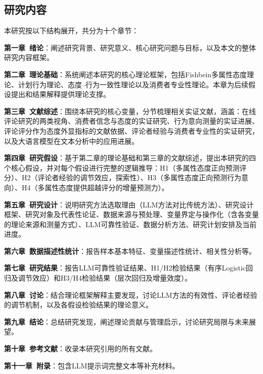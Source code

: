 \subsection{研究内容}

本研究按以下结构展开，共分为十个章节：

\textbf{第一章\ 绪论}：阐述研究背景、研究意义、核心研究问题与目标，以及本文的整体研究内容框架。

\textbf{第二章\ 理论基础}：系统阐述本研究的核心理论框架，包括Fishbein多属性态度理论、计划行为理论、态度--行为一致性理论以及消费者专业性理论。本章为后续假设提出和结果解释提供理论支撑。

\textbf{第三章\ 文献综述}：围绕本研究的核心变量，分节梳理相关实证文献，涵盖：在线评论研究的两类视角、消费者信念与态度的实证研究、行为意向测量的实证进展、评论评分作为态度外显指标的文献依据、评论者经验与消费者专业性的实证研究，以及大语言模型在文本分析中的应用进展。

\textbf{第四章\ 研究假设}：基于第二章的理论基础和第三章的文献综述，提出本研究的四个核心假设，并对每个假设进行完整的逻辑推导：H1（多属性态度正向预测评分）、H2（评论者经验的调节效应，探索性）、H3（多属性态度正向预测行为意向）、H4（多属性态度提供超越评分的增量预测力）。

\textbf{第五章\ 研究设计}：说明研究方法选取理由（LLM方法对比传统方法）、研究设计框架、研究对象及代表性论证、数据来源与预处理、变量界定与操作化（含各变量的理论来源和测量方式）、LLM可靠性验证、数据分析方法、研究计划安排及当前进度。

\textbf{第六章\ 数据描述性统计}：报告样本基本特征、变量描述性统计、相关性分析等。

\textbf{第七章\ 研究结果}：报告LLM可靠性验证结果、H1/H2检验结果（有序Logistic回归及调节效应）和H3/H4检验结果（层次回归及增量效度）。

\textbf{第八章\ 讨论}：结合理论框架解释主要发现，讨论LLM方法的有效性、评论者经验的调节机制，以及各假设检验结果的理论意义。

\textbf{第九章\ 结论}：总结研究发现，阐述理论贡献与管理启示，讨论研究局限与未来展望。

\textbf{第十章\ 参考文献}：收录本研究引用的所有文献。

\textbf{第十一章\ 附录}：包含LLM提示词完整文本等补充材料。

